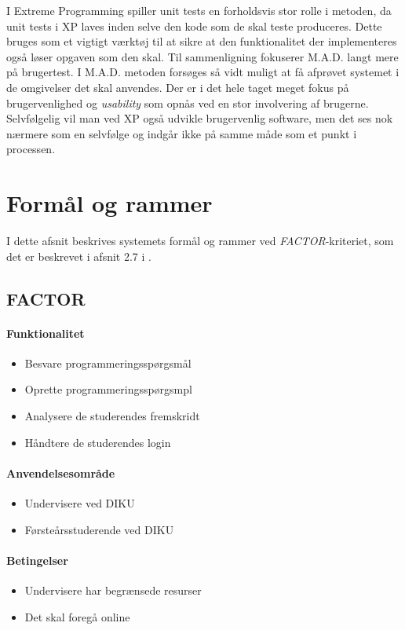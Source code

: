 \documentclass[11pt, a4paper]{article}
\begin{document}
I Extreme Programming spiller unit tests en forholdsvis stor rolle i metoden, da unit tests i XP laves inden selve den kode som de skal teste produceres. Dette bruges som et vigtigt værktøj til at sikre at den funktionalitet der implementeres også løser opgaven som den skal. Til sammenligning fokuserer M.A.D. langt mere på brugertest. I M.A.D. metoden forsøges så vidt muligt at få afprøvet systemet i de omgivelser det skal anvendes. Der er i det hele taget meget fokus på brugervenlighed og \emph{usability} som opnås ved en stor involvering af brugerne. Selvfølgelig vil man ved XP også udvikle brugervenlig software, men det ses nok nærmere som en selvfølge og indgår ikke på samme måde som et punkt i processen.


\newpage

\section{Formål og rammer}
\label{sec:formal_og_rammer}
I dette afsnit beskrives systemets formål og rammer ved \textit{FACTOR}-kriteriet, som det er beskrevet i afsnit 2.7 i \cite{mathiassen2000object}.

\subsection{FACTOR}
\label{sub:factor}
\paragraph{Funktionalitet}
\begin{itemize}
    \item Besvare programmeringsspørgsmål
    \item Oprette programmeringsspørgsmpl
    \item Analysere de studerendes fremskridt
    \item Håndtere de studerendes login
\end{itemize}

\paragraph{Anvendelsesområde}
\begin{itemize}
    \item Undervisere ved DIKU
    \item Førsteårsstuderende ved DIKU
\end{itemize}

\paragraph{Betingelser}
\begin{itemize}
    \item Undervisere har begrænsede resurser
    \item Det skal foregå online
\end{itemize}
\end{document}

